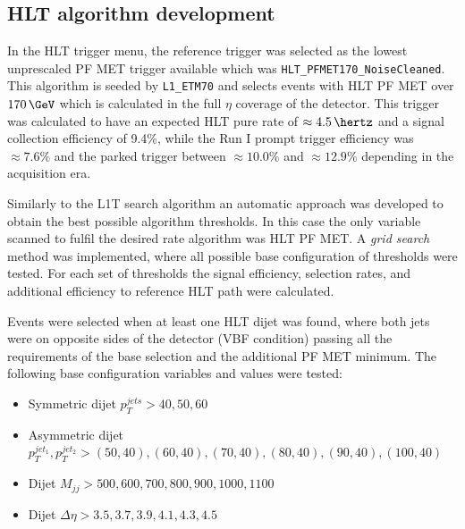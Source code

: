 \subsection{HLT algorithm development}
\label{SECTION:RunIITriggerStudies_HLTAlgorithmDevelopment}


In the \gls{HLT} trigger menu, the reference trigger was selected as the lowest unprescaled \gls{PF} \gls{MET} trigger available which was \verb|HLT_PFMET170_NoiseCleaned|. This algorithm is seeded by \verb|L1_ETM70| and selects events with \gls{HLT} \gls{PF} \gls{MET} over $170\,\GeV$ which is calculated in the full $\eta$ coverage of the detector. This trigger was calculated to have an expected \gls{HLT} pure rate of $\approx 4.5\,\hertz$ and a signal collection efficiency of 9.4\%, while the Run I prompt trigger efficiency was $\approx 7.6\%$ and the parked trigger between $\approx 10.0\%$ and $\approx 12.9\%$ depending in the acquisition era. 

Similarly to the \gls{L1T} search algorithm an automatic approach was developed to obtain the best possible algorithm thresholds. In this case the only variable scanned to fulfil the desired rate algorithm was \gls{HLT} \gls{PF} \gls{MET}. A \textit{grid search} method was implemented, where all possible base configuration of thresholds were tested. For each set of thresholds the signal efficiency, selection rates, and additional efficiency to reference \gls{HLT} path were calculated. 

Events were selected when at least one \gls{HLT} dijet was found, where both jets were on opposite sides of the detector (\gls{VBF} condition) passing all the requirements of the base selection and the additional \gls{PF} \gls{MET} minimum. The following base configuration variables and values were tested:

\begin{itemize}
  \item Symmetric dijet $p_T^{jets}>{40,50,60}$
  \item Asymmetric dijet $p_T^{jet_1},p_T^{jet_2}>{(50,40),(60,40),(70,40),(80,40),(90,40),(100,40)}$
  \item Dijet $M_{jj}>{500,600,700,800,900,1000,1100}$
  \item Dijet $\Delta\eta>{3.5,3.7,3.9,4.1,4.3,4.5}$
\end{itemize}

